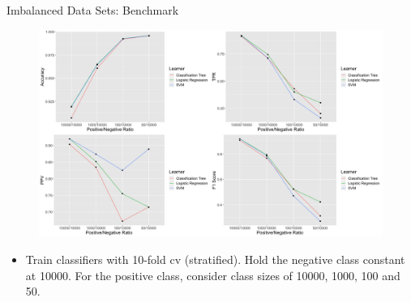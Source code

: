 \documentclass[11pt,compress,t,notes=noshow, xcolor=table]{beamer}
\begin{document}
\begin{vbframe}{Imbalanced Data Sets: Benchmark}
%
			\begin{figure}
				\centering
				\includegraphics[width=0.95\linewidth]{figure_man/benchmark_plots.png}
			\end{figure}
			
			\begin{itemize}
			\footnotesize
                \item Train classifiers with 10-fold cv (stratified). Hold the negative class constant at 10000. For the positive class, consider class sizes of 10000, 1000, 100 and 50. 			
			\end{itemize}

%
\end{vbframe}
\end{document}
